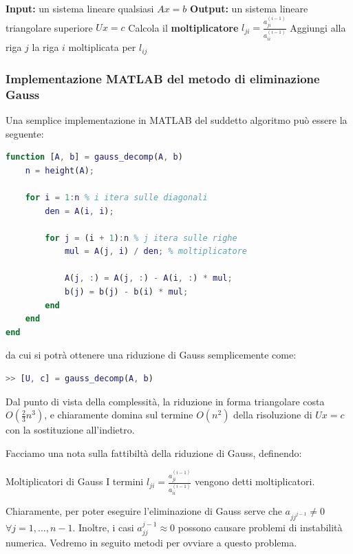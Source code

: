 \documentclass[a4paper,11pt]{article}
\begin{document}
\begin{algorithm}
\caption{Eliminazione di Gauss}
\begin{algorithmic}
	\STATE \textbf{Input:} un sistema lineare qualsiasi $Ax = b$ %
	\STATE \textbf{Output:} un sistema lineare triangolare superiore $Ux = c$ %
			\STATE Calcola il \textbf{moltiplicatore} $l_{ji} = \frac{a_{ji}^{(i - 1)}}{a_{ii}^{(i - 1)}}$
			\STATE Aggiungi alla riga $j$ la riga $i$ moltiplicata per $l_{ij}$
		\ENDFOR
	\ENDFOR
\end{algorithmic}
\end{algorithm}

\subsubsection{Implementazione MATLAB del metodo di eliminazione Gauss}
Una semplice implementazione in MATLAB del suddetto algoritmo può essere la seguente:
\begin{lstlisting}[language=matlab, style=codestyle]	
function [A, b] = gauss_decomp(A, b)
    n = height(A);

    for i = 1:n % i itera sulle diagonali
        den = A(i, i);

        for j = (i + 1):n % j itera sulle righe
            mul = A(j, i) / den; % moltiplicatore
            
            A(j, :) = A(j, :) - A(i, :) * mul;
            b(j) = b(j) - b(i) * mul;
        end
    end
end
\end{lstlisting}
da cui si potrà ottenere una riduzione di Gauss semplicemente come:
\begin{lstlisting}[language=matlab, style=codestyle]	
	>> [U, c] = gauss_decomp(A, b)
\end{lstlisting}

\par\smallskip

Dal punto di vista della complessità, la riduzione in forma triangolare costa $O(\frac{2}{3}n^3)$, e chiaramente domina sul termine $O(n^2)$ della risoluzione di $Ux = c$ con la sostituzione all'indietro.

Facciamo una nota sulla fattibiltà della riduzione di Gauss, definendo:
\begin{definition}{Moltiplicatori di Gauss}
	I termini $l_{ji} = \frac{a_{ji}^{(i - 1)}}{a_{ii}^{(i - 1)}}$ vengono detti moltiplicatori.
\end{definition}
Chiaramente, per poter eseguire l'eliminazione di Gauss serve che $a_{jj^{j - 1}} \neq 0$ $\forall j = 1, ..., n - 1$.
Inoltre, i casi $a_{jj}^{j - 1} \approx 0$ possono causare problemi di instabilità numerica.
Vedremo in seguito metodi per ovviare a questo problema.
\end{document}
